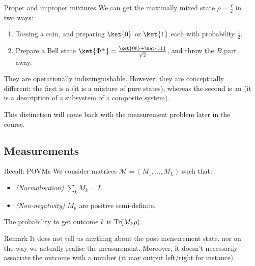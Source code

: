 \documentclass[a4paper]{article}
\begin{document}
\begin{parag}{Proper and improper mixtures}
    We can get the maximally mixed state $\rho = \frac{I}{2}$ in two ways:
    \begin{enumerate}
        \item Tossing a coin, and preparing $\ket{0}$ or $\ket{1}$ each with probability $\frac{1}{2}$.
        \item Prepare a Bell state $\ket{\Phi^+} = \frac{\ket{00} + \ket{11}}{\sqrt{2}}$, and throw the $B$ part away.
    \end{enumerate}

    They are operationally indistinguishable. However, they are conceptually different: the first is a  (it is a mixture of pure states), whereas the second is an  (it is a description of a subsystem of a composite system).

    This distinction will come back with the measurement problem later in the course.
\end{parag}

\subsection{Measurements}

\begin{parag}{Recall: POVMs}
    We consider matrices $\mathcal{M} = \left(M_1, \ldots, M_L\right)$ such that: 
    \begin{itemize}
        \item \textit{(Normalisation)} $\sum_{k} M_k = I$.
        \item \textit{(Non-negativity)} $M_k$ are positive semi-definite.
    \end{itemize}

    The probability to get outcome $k$ is $\Tr\left(M_k \rho\right)$.

    \begin{subparag}{Remark}
        It does not tell us anything about the post measurement state, nor on the way we actually realise the measurement. Moreover, it doesn't necessarily associate the outcome with a number (it may output left/right for instance).
    \end{subparag}
\end{parag}
\end{document}
